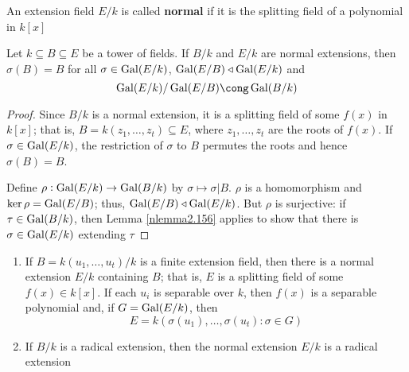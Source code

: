 \documentclass[11pt]{article}
\begin{document}
\begin{definition}[]
An extension field \(E/k\) is called \textbf{normal} if it is the splitting field of
a polynomial in \(k[x]\)
\end{definition}

\begin{theorem}[]
\label{nthm3.17}
Let \(k\subseteq B\subseteq E\) be a tower of fields. If \(B/k\) and \(E/k\)
are normal extensions, then \(\sigma(B)=B\) for all \(\sigma\in\operatorname{Gal}(E/k)\),
\(\operatorname{Gal}(E/B)\triangleleft\operatorname{Gal}(E/k)\) and
\begin{equation*}
\Gal(E/k)/\Gal(E/B)\cong\Gal(B/k)
\end{equation*}
\end{theorem}

\begin{proof}
Since \(B/k\) is a normal extension, it is a splitting field of some
\(f(x)\) in \(k[x]\); that is, \(B=k(z_1,\dots,z_t)\subseteq E\), where
\(z_1,\dots,z_t\) are the roots of \(f(x)\). If \(\sigma\in\operatorname{Gal}(E/k)\), the
restriction of \(\sigma\) to \(B\) permutes the roots and hence \(\sigma(B)=B\).

Define \(\rho:\operatorname{Gal}(E/k)\to\operatorname{Gal}(B/k)\) by \(\sigma\mapsto\sigma|B\). \(\rho\) is a
homomorphism and \(\ker\rho=\operatorname{Gal}(E/B)\); thus, \(\operatorname{Gal}(E/B)\triangleleft\operatorname{Gal}(E/k)\).
But \(\rho\) is surjective: if \(\tau\in\operatorname{Gal}(B/k)\), then Lemma \ref{nlemma2.156}
applies to show that there is \(\sigma\in\operatorname{Gal}(E/k)\) extending \(\tau\)
\end{proof}

\begin{lemma}[]
\label{nlemma3.18}
\begin{enumerate}
\item If \(B=k(u_1,\dots,u_t)/k\) is a finite extension field, then there is a
normal extension \(E/k\) containing \(B\); that is, \(E\) is a splitting
field of some \(f(x)\in k[x]\). If each \(u_i\) is separable over \(k\),
then \(f(x)\) is a separable polynomial and, if \(G=\operatorname{Gal}(E/k)\), then
\begin{equation*}
E=k(\sigma(u_1),\dots,\sigma(u_t):\sigma\in G)
\end{equation*}
\item If \(B/k\) is a radical extension, then the normal extension \(E/k\) is a
radical extension
\end{enumerate}
\end{lemma}
\end{document}
